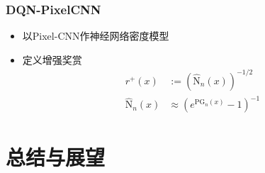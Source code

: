 \documentclass{beamer}
\begin{document}
\begin{CJK*}{GBK}{hei}
\begin{frame}\frametitle{DQN-PixelCNN}
\begin{itemize}
\item \citep{ostrovski2017count}以Pixel-CNN作神经网络密度模型
\item 定义增强奖赏
\begin{align*}
            r^{+}(x)&:=\left(\hat{\mathrm{N}}_{n}(x)\right)^{-1 / 2}\\
            \hat{\mathrm{N}}_{n}(x) &\approx\left(e^{\mathrm{PG}_{n}(x)}-1\right)^{-1}
\end{align*}
\end{itemize}
\end{frame}


\section{总结与展望}


\end{CJK*}
\end{document}
